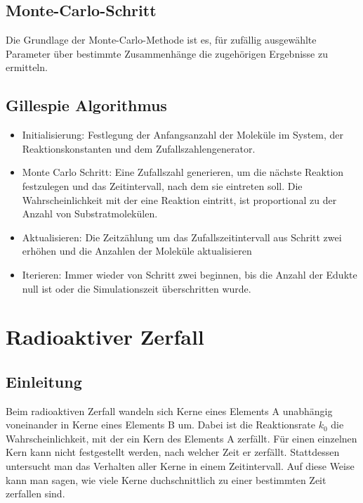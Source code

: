\documentclass{scrartcl}
\begin{document}
 
\subsection{Monte-Carlo-Schritt}

Die Grundlage der Monte-Carlo-Methode ist es, für zufällig ausgewählte Parameter über bestimmte Zusammenhänge die zugehörigen Ergebnisse zu ermitteln.
\subsection{Gillespie Algorithmus}
\begin{itemize}
    \item{Initialisierung}: Festlegung der Anfangsanzahl der Moleküle im System, der Reaktionskonstanten und dem Zufallszahlengenerator.
\item{Monte Carlo Schritt}: Eine Zufallszahl generieren, um die nächste Reaktion festzulegen und das Zeitintervall, nach dem sie eintreten soll. Die Wahrscheinlichkeit mit der eine Reaktion eintritt, ist proportional zu der Anzahl von Substratmolekülen.
\item{Aktualisieren}: Die Zeitzählung um das Zufallszeitintervall aus Schritt zwei erhöhen und die Anzahlen der Moleküle aktualisieren
\item{Iterieren}: Immer wieder von Schritt zwei beginnen, bis die Anzahl der Edukte null ist oder die Simulationszeit überschritten wurde.
\end{itemize}

\newpage

\section{Radioaktiver Zerfall}
\subsection{Einleitung}
Beim radioaktiven Zerfall wandeln sich Kerne eines Elements A unabhängig voneinander in Kerne eines Elements B um. Dabei ist die Reaktionsrate $k_0$ die Wahrscheinlichkeit, mit der ein Kern des Elements A zerfällt. Für einen einzelnen Kern kann nicht festgestellt werden, nach welcher Zeit er zerfällt. Stattdessen untersucht man das Verhalten aller Kerne in einem Zeitintervall. Auf diese Weise kann man sagen, wie viele Kerne duchschnittlich zu einer bestimmten Zeit zerfallen sind.
\end{document}
